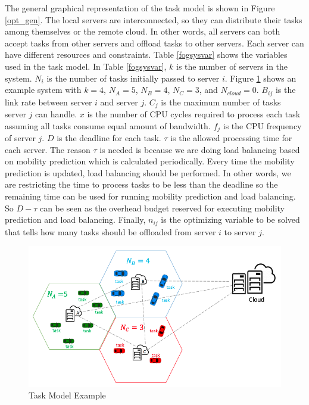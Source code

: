 The general graphical representation of the task model is shown in Figure \ref{opt_gen}. The local servers are interconnected, so they can distribute their tasks among themselves or the remote cloud. In other words, all servers can both accept tasks from other servers and offload tasks to other servers. Each server can have different resources and constraints. Table \ref{fogsysvar} shows the variables used in the task model. In Table \ref{fogsysvar}, $k$ is the number of servers in the system. $N_{i}$ is the number of tasks initially passed to server $i$. Figure \ref{opt_rep} shows an example system with $k=4$, $N_{A}=5$, $N_{B}=4$, $N_{C}=3$, and $N_{cloud}=0$. $B_{ij}$ is the link rate between server $i$ and server $j$. $C_{j}$ is the maximum number of tasks server $j$ can handle. $x$ is the number of CPU cycles required to process each task assuming all tasks consume equal amount of bandwidth. $f_{j}$ is the CPU frequency of server $j$. $D$ is the deadline for each task.  $\tau$ is the allowed processing time for each server. The reason $\tau$ is needed is because we are doing load balancing based on mobility prediction which is calculated periodically. Every time the mobility prediction is updated, load balancing should be performed. In other words, we are restricting the time to process tasks to be less than the deadline so the remaining time can be used for running mobility prediction and load balancing. So $D-\tau$ can be seen as the overhead budget reserved for executing mobility prediction and load balancing. Finally, $n_{ij}$ is the optimizing variable to be solved that tells how many tasks should be offloaded from server $i$ to server $j$. 






\begin{figure}[ht!]
\centering
\includegraphics[width=1\linewidth]{images/opt_rep}
\caption{Task Model Example}
\label{opt_rep}
\end{figure}

